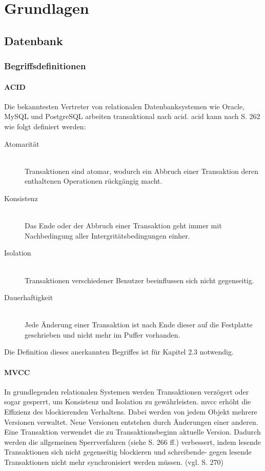 \chapter{Grundlagen}

\section{Datenbank}

\subsection{Begriffsdefinitionen}

\subsubsection{ACID}
Die bekanntesten Vertreter von relationalen Datenbanksystemen wie Oracle, MySQL und PostgreSQL arbeiten transaktional nach \Gls{acid}.
\Gls{acid} kann nach \cite{book:kudrass} S. 262 wie folgt definiert werden:
\begin{description}
\item[Atomarität] \hfill \\
Transaktionen sind atomar, wodurch ein Abbruch einer Transaktion deren enthaltenen Operationen rückgängig macht.
\item[Konsistenz] \hfill \\
Das Ende oder der Abbruch einer Transaktion geht immer mit Nachbedingung aller Intergritätsbedingungen einher.
\item[Isolation] \hfill \\
Transaktionen verschiedener Benutzer beeinflussen sich nicht gegenseitig.
\item[Dauerhaftigkeit] \hfill \\
Jede Änderung einer Transaktion ist nach Ende dieser auf die Festplatte geschrieben und nicht mehr im Puffer vorhanden.
\end{description}
Die Definition dieses anerkannten Begriffes ist für Kapitel 2.3 notwendig.

\subsubsection{MVCC}
In grundlegenden relationalen Systemen werden Transaktionen verzögert oder sogar gesperrt, um Konsistenz und Isolation zu gewährleisten.
\Gls{mvcc} erhöht die Effizienz des  blockierenden Verhaltens.
Dabei werden von jedem Objekt mehrere Versionen verwaltet.
Neue Versionen entstehen durch Änderungen einer anderen.
Eine Transaktion verwendet die zu Transaktionsbeginn aktuelle Version.
Dadurch werden die allgemeinen Sperrverfahren (siehe \cite{book:kudrass} S. 266 ff.) verbessert, indem lesende Transaktionen sich nicht gegenseitig blockieren und schreibende- gegen lesende Transaktionen nicht mehr synchronisiert werden müssen. (vgl. \cite{book:kudrass} S. 270)

